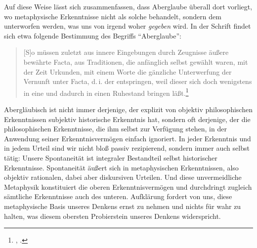 Auf diese Weise lässt sich zusammenfassen, dass Aberglaube überall dort
vorliegt, wo metaphysische Erkenntnisse nicht als solche behandelt, sondern dem
unterworfen werden, was uns von irgend woher \emph{gegeben} wird. In der Schrift
 findet sich etwa folgende
Bestimmung des Begriffs \enquote{Aberglaube}:
\begin{quote}
[S]o müssen zuletzt aus innere Eingebungen durch Zeugnisse äußere
bewährte Facta, aus Traditionen, die anfänglich selbst gewählt waren, mit der
Zeit  Urkunden, mit einem Worte die gänzliche Unterwerfung
der Vernunft unter Facta, d.\,i. der  entspringen, weil dieser
sich doch wenigstens in eine  und dadurch in einen
Ruhestand bringen läßt.\footnote{\cite[][A
327]{Kant:Washeisst:SichimDenkenorientieren?1977}, \cite[][VIII:
145.30--35]{Kant:GesammelteWerke1900ff.}.}
\end{quote}
Abergläubisch ist nicht immer derjenige, der explizit von objektiv
philosophischen Erkenntnissen subjektiv historische Erkenntnis hat, sondern oft
derjenige, der die philosophischen Erkenntnisse, die ihm selbst zur Verfügung
stehen, in der Anwendung seiner Erkenntnisvermögen einfach ignoriert. In jeder
Erkenntnis und in jedem Urteil sind wir nicht bloß passiv rezipierend, sondern
immer auch selbst tätig: Unsere Spontaneität ist integraler Bestandteil selbst
historischer Erkenntnisse. Spontaneität äußert sich in metaphysischen
Erkenntnissen, also objektiv rationalen, dabei aber diskursiven Urteilen. Und
diese unvermeidliche Metaphysik konstituiert die oberen Erkenntnisvermögen und
durchdringt zugleich sämtliche Erkenntnisse auch des unteren.
Aufklärung fordert von uns, diese metaphysische Basis unseres Denkens ernst zu
nehmen und nichts für wahr zu halten, was diesem obersten Probierstein unseres
Denkens widerspricht.


